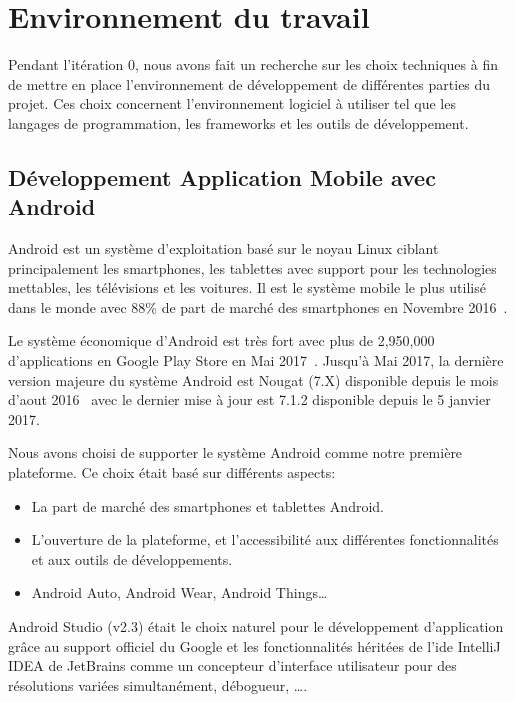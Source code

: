 \section{Environnement du travail}

Pendant l'itération 0, nous avons fait un recherche sur les choix techniques à
fin de mettre en place l'environnement de développement de différentes parties
du projet. Ces choix concernent l'environnement logiciel à utiliser tel que les
langages de programmation, les frameworks et les outils de développement.

\subsection{Développement Application Mobile avec Android}

Android est un système d'exploitation basé sur le noyau Linux ciblant
principalement les smartphones, les tablettes avec support pour les
technologies mettables, les télévisions et les voitures. Il est le système
mobile le plus utilisé dans le monde avec 88\% de part de marché des
smartphones en Novembre 2016~\cite{android-market-share}.

Le système économique d'Android est très fort avec plus de 2,950,000
d'applications en Google Play Store en Mai 2017~\cite{android-apps}. Jusqu'à
Mai 2017, la dernière version majeure du système Android est Nougat (7.X)
disponible depuis le mois d'aout 2016~\cite{android-7-release} avec le dernier
mise à jour est 7.1.2 disponible depuis le 5 janvier 2017.

Nous avons choisi de supporter le système Android comme notre première
plateforme. Ce choix était basé sur différents aspects:

\begin{itemize}
    \item La part de marché des smartphones et tablettes Android.
    \item L'ouverture de la plateforme, et l'accessibilité aux différentes
        fonctionnalités et aux outils de développements.
    \item Android Auto, Android Wear, Android Things\ldots
\end{itemize}

Android Studio (v2.3) était le choix naturel pour le développement
d'application grâce au support officiel du Google et les fonctionnalités
héritées de l'ide IntelliJ IDEA de JetBrains comme un concepteur d'interface
utilisateur pour des résolutions variées simultanément, débogueur, \ldots.

